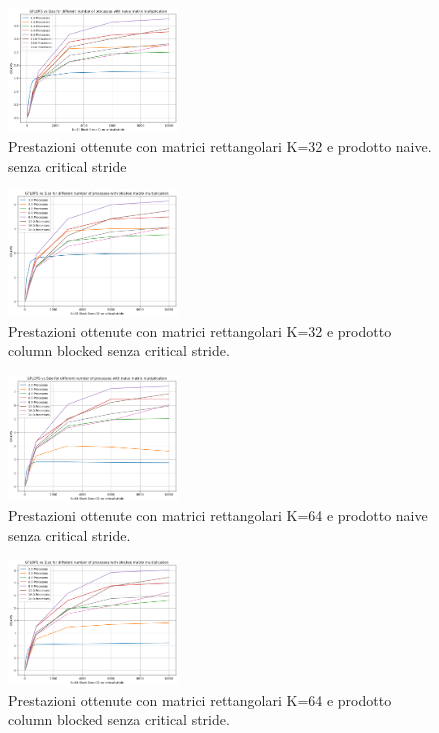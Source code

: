 \documentclass[conference]{IEEEtran}
\begin{document}
\begin{figure}[H]
    \centering
    \includegraphics[width=0.4\textwidth]{resources/rect_k32_naive_nocrit.png}
    \caption{Prestazioni ottenute con matrici rettangolari K=32 e prodotto naive. senza critical stride}
    \label{fig:rect_k32_matrix_naive_nocrit}
\end{figure}
\begin{figure}[H]
    \centering
    \includegraphics[width=0.4\textwidth]{resources/rect_k32_blocked_nocrit.png}
    \caption{Prestazioni ottenute con matrici rettangolari K=32 e prodotto column blocked senza critical stride.}
    \label{fig:rect_k32_matrix_blocked_nocrit}
\end{figure}
\begin{figure}[H]
    \centering
    \includegraphics[width=0.4\textwidth]{resources/rect_k64_naive_nocrit.png}
    \caption{Prestazioni ottenute con matrici rettangolari K=64 e prodotto naive senza critical stride.}
    \label{fig:rect_k64_matrix_naive_nocrit}
\end{figure}
\begin{figure}[H]
    \centering
    \includegraphics[width=0.4\textwidth]{resources/rect_k64_blocked_nocrit.png}
    \caption{Prestazioni ottenute con matrici rettangolari K=64 e prodotto column blocked senza critical stride.}
    \label{fig:rect_k64_matrix_blocked_nocrit}
\end{figure}
\end{document}
